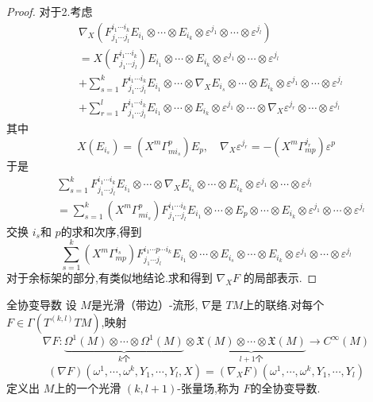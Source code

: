 \documentclass[../../几何与拓扑.tex]{subfiles}
\begin{document}
\begin{proof}
    对于2.考虑 \[
     \begin{aligned}
        &\nabla _{X} \left( F^{i_1\cdots i_{k}} _{j_1\cdots j_{l}} E_{i_1}\otimes \cdots \otimes E_{i_{k}}\otimes \varepsilon ^{j_1}\otimes \cdots \otimes \varepsilon ^{j_{l}}\right)\\ 
        & =   X\left( F^{i_1\cdots i_{k}}_{j_1\cdots j_{l}} \right) E_{i_1}\otimes \cdots \otimes E_{i_{k}} \otimes \varepsilon ^{j_1}\otimes \cdots \otimes \varepsilon ^{j_{l}} \\ 
         &+ \sum _{s= 1}^{k} F^{i_1\cdots i_{k}}_{j_1\cdots j_{l}} E_{i_1}\otimes \cdots \otimes  \nabla _{X}E_{i_{s}}\otimes \cdots \otimes  E_{i_k}\otimes \varepsilon ^{j_1}\otimes \cdots \otimes \varepsilon ^{j_{l}} \\ 
          & +  \sum _{r= 1}^{l} F^{i_1\cdots i_{k}}_{j_1\cdots j_{l}} E_{i_1}\otimes \cdots \otimes E_{i_{k}} \otimes \varepsilon ^{j_1}\otimes \cdots \otimes  \nabla _{X} \varepsilon ^{j_{r}} \otimes \cdots \otimes \varepsilon ^{j_{l}}
     \end{aligned} 
    \]其中 \[
    X\left( E_{i_{s}} \right)= \left(   X^{m} \Gamma _{m i_{s}}^{p} \right)E_{p} , \quad  \nabla _{X} \varepsilon ^{j_{r}}  = -\left( X^{m} \Gamma _{mp}^{j_{r}} \right) \varepsilon ^{p}
    \]于是 \[
    \begin{aligned}
    &\sum _{s= 1}^{k} F^{i_1\cdots i_{k}}_{j_1\cdots j_{l}} E_{i_1}\otimes \cdots \otimes   \nabla _{X}E_{i_{s}} \otimes \cdots \otimes E_{i_{k}}\otimes \varepsilon ^{j_1}\otimes \cdots \otimes \varepsilon ^{j_{l}} \\ 
     & = \sum _{s= 1}^{k}  \left( X^{m} \Gamma ^{p}_{m i_{s}} \right)F^{i_1\cdots i_{k}}_{j_1\cdots j_{l}} E_{i_1}\otimes \cdots \otimes E_{p}\otimes \cdots \otimes E_{i_{k}}\otimes \varepsilon ^{j_1}\otimes \cdots \otimes \varepsilon ^{j_{l}}
    \end{aligned}
    \]交换 \(  i_{s}  \)和 \(  p  \)的求和次序,得到 \[
    \sum _{s= 1}^{k}\left( X^{m} \Gamma ^{i_{s}}_{mp}\right)  F^{i_1\cdots p\cdots i_{k}}_{j_1\cdots j_{l}} E_{i_1}\otimes \cdots \otimes E_{i_{s}}\otimes \cdots \otimes E_{i_{k}}\otimes  \varepsilon ^{j_1}\otimes \cdots \otimes  \varepsilon ^{j_{l}}
    \]对于余标架的部分,有类似地结论.求和得到 \(   \nabla _{X}F  \) 的局部表示.
\end{proof}

\begin{proposition}{全协变导数}
    设 \(  M  \)是光滑（带边）-流形, \(   \nabla   \)是 \(  TM  \)上的联络.对每个 \(  F \in  \Gamma \left( T^{\left( k,l \right) }TM \right)   \),映射 \[
     \nabla F: \underbrace{ \Omega ^{1}\left( M \right)\otimes \cdots \otimes  \Omega ^{1}\left( M \right)  }_{k \text{个}} \otimes  \underbrace{\mathfrak{X}\left( M \right)\otimes \cdots \otimes \mathfrak{X}\left( M \right)  }_{ l+ 1 \text{个}}\to  C^{\infty}\left( M \right) 
    \] \[
    \left(  \nabla F \right)\left(  \omega^1,\cdots,\omega^k ,  Y_1,\cdots,Y_l ,X \right) =  \left(  \nabla _{X}F \right) \left(  \omega^1,\cdots,\omega^k , Y_1,\cdots,Y_l  \right)    
    \]    定义出 \(  M  \)上的一个光滑 \(  \left( k,l+ 1 \right)   \)-张量场,称为 \(  F  \)的全协变导数.   
\end{proposition}
\end{document}
